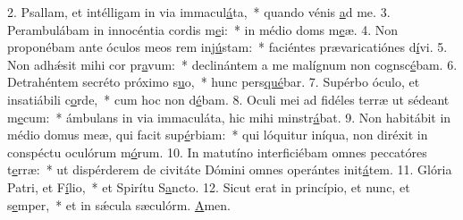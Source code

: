2. Psallam, et intélligam in via immacul\uline{á}ta,~* quando vénis \uline{a}d me.
3. Perambulábam in innocéntia cordis m\uline{e}i:~* in médio doms m\uline{e}æ.
4. Non proponébam ante óculos meos rem inj\uline{ú}stam:~* faciéntes prævaricatiónes d\uline{í}vi.
5. Non adhǽsit mihi cor pr\uline{a}vum:~* declinántem a me malígnum non cognsc\uline{é}bam.
6. Detrahéntem secréto próximo s\uline{u}o,~* hunc pers\uline{qué}bar.
7. Supérbo óculo, et insatiábili c\uline{o}rde,~* cum hoc non d\uline{é}bam.
8. Oculi mei ad fidéles terræ ut sédeant m\uline{e}cum:~* ámbulans in via immaculáta, hic mihi minstr\uline{á}bat.
9. Non habitábit in médio domus meæ, qui facit sup\uline{é}rbiam:~* qui lóquitur iníqua, non diréxit in conspéctu oculórum m\uline{ó}rum.
10. In matutíno interficiébam omnes peccatóres t\uline{e}rræ:~* ut dispérderem de civitáte Dómini omnes operántes init\uline{á}tem.
11. Glória Patri, et F\uline{í}lio,~* et Spirítu S\uline{a}ncto.
12. Sicut erat in princípio, et nunc, et s\uline{e}mper,~* et in sǽcula sæculórm. \uline{A}men.
